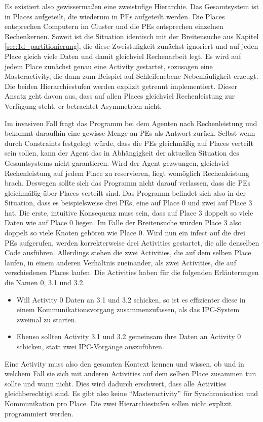 Es existiert also gewissermaßen eine zweistufige Hierarchie. Das Gesamtsystem ist in Places aufgeteilt, die wiederum in PEs aufgeteilt werden. Die Places entsprechen Computern im Cluster und die PEs entsprechen einzelnen Rechenkernen. Soweit ist die Situation identisch mit der Breitensuche aus Kapitel \ref{sec:1d_partitionierung}, die diese Zweistufigkeit zunächst ignoriert und auf jeden Place gleich viele Daten und damit gleichviel Rechenarbeit legt. Es wird auf jedem Place zunächst genau eine Activity gestartet, sozusagen eine Masteractivity, die dann zum Beispiel auf Schleifenebene Nebenläufigkeit erzeugt. Die beiden Hierarchiestufen werden explizit getrennt implementiert. Dieser Ansatz geht davon aus, dass auf allen Places gleichviel Rechenleistung zur Verfügung steht, er betrachtet Asymmetrien nicht.

Im invasiven Fall fragt das Programm bei dem Agenten nach Rechenleistung und bekommt daraufhin eine gewisse Menge an PEs als Antwort zurück. Selbst wenn durch Constraints festgelegt würde, dass die PEs gleichmäßig auf Places verteilt sein sollen, kann der Agent das in Abhängigkeit der aktuellen Situation des Gesamtsystems nicht garantieren. Wird der Agent gezwungen, gleichviel Rechenleistung auf jedem Place zu reservieren, liegt womöglich Rechenleistung brach. Deswegen sollte sich das Programm nicht darauf verlassen, dass die PEs gleichmäßig über Places verteilt sind. Das Programm befindet sich also in der Situation, dass es beispielsweise drei PEs, eine auf Place 0 und zwei auf Place 3 hat. Die erste, intuitive Konsequenz muss sein, dass auf Place 3 doppelt so viele Daten wie auf Place 0 liegen. Im Falle der Breitensuche würden Place 3 also doppelt so viele Knoten gehören wie Place 0. Wird nun ein infect auf die drei PEs aufgerufen, werden korrekterweise drei Activities gestartet, die alle denselben Code ausführen. Allerdings stehen die zwei Activities, die auf dem selben Place laufen, in einem anderen Verhältnis zueinander, als zwei Activities, die auf verschiedenen Places laufen. Die Activities haben für die folgenden Erläuterungen die Namen 0, 3.1 und 3.2.

\begin{itemize}
	\item Will Activity 0 Daten an 3.1 und 3.2 schicken, so ist es effizienter diese in einem Kommunikationsvorgang zusammenzufassen, als das IPC-System zweimal zu starten.
	\item Ebenso sollten Activity 3.1 und 3.2 gemeinsam ihre Daten an Activity 0 schicken, statt zwei IPC-Vorgänge auszuführen.
\end{itemize}
Eine Activity muss also den gesamten Kontext kennen und wissen, ob und in welchem Fall sie sich mit anderen Activities auf dem selben Place zusammen tun sollte und wann nicht. Dies wird dadurch erschwert, dass alle Activities gleichberechtigt sind. Es gibt also keine \enquote{Masteractivity} für Synchronisation und Kommunikation pro Place. Die zwei Hierarchiestufen sollen nicht explizit programmiert werden.

